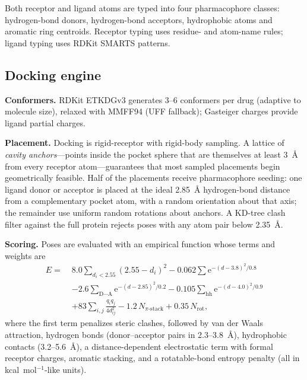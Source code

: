 \documentclass[10pt,a4paper,twocolumn]{article}
\begin{document}
Both receptor and ligand atoms are typed into four pharmacophore classes: hydrogen-bond
donors, hydrogen-bond acceptors, hydrophobic atoms and aromatic ring centroids. Receptor
typing uses residue- and atom-name rules; ligand typing uses RDKit SMARTS patterns.

\subsection{Docking engine}
\label{sec:docking}

\textbf{Conformers.} RDKit ETKDGv3 generates 3--6 conformers per drug (adaptive to
molecule size), relaxed with MMFF94 (UFF fallback); Gasteiger charges provide ligand
partial charges.

\textbf{Placement.} Docking is rigid-receptor with rigid-body sampling. A lattice of
\emph{cavity anchors}---points inside the pocket sphere that are themselves at least
3~\AA{} from every receptor atom---guarantees that most sampled placements begin
geometrically feasible. Half of the placements receive pharmacophore seeding: one ligand
donor or acceptor is placed at the ideal 2.85~\AA{} hydrogen-bond distance from a
complementary pocket atom, with a random orientation about that axis; the remainder use
uniform random rotations about anchors. A KD-tree clash filter against the full protein
rejects poses with any atom pair below 2.35~\AA.

\textbf{Scoring.} Poses are evaluated with an empirical function whose terms and weights
are
\begin{equation}
\begin{aligned}
E = \; & 8.0\!\sum_{d_i<2.55}(2.55-d_i)^2
        - 0.062\!\sum \mathrm{e}^{-(d-3.8)^2/0.8}\\
       & - 2.6\!\sum_{\text{D}\cdots\text{A}}\!\mathrm{e}^{-(d-2.85)^2/0.2}
        - 0.105\!\sum_{\text{hh}}\!\mathrm{e}^{-(d-4.0)^2/0.9}\\
       & + 83\!\sum_{i,j}\frac{q_i q_j}{4d_{ij}^2}
        - 1.2\,N_{\pi\text{-stack}} + 0.35\,N_{\text{rot}},
\end{aligned}
\label{eq:score}
\end{equation}
where the first term penalizes steric clashes, followed by van der Waals attraction,
hydrogen bonds (donor--acceptor pairs in 2.3--3.8~\AA), hydrophobic contacts
(3.2--5.6~\AA), a distance-dependent electrostatic term with formal receptor charges,
aromatic stacking, and a rotatable-bond entropy penalty (all in kcal~mol$^{-1}$-like
units).
\end{document}
